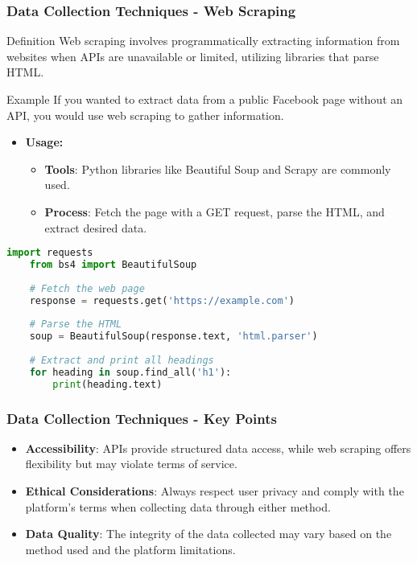 \documentclass{beamer}
\begin{document}
\begin{frame}[fragile]
    \frametitle{Data Collection Techniques - Web Scraping}
    \begin{block}{Definition}
        Web scraping involves programmatically extracting information from websites when APIs are unavailable or limited, utilizing libraries that parse HTML.
    \end{block}

    \begin{block}{Example}
        If you wanted to extract data from a public Facebook page without an API, you would use web scraping to gather information.
    \end{block}

    \begin{itemize}
        \item \textbf{Usage:}
            \begin{itemize}
                \item \textbf{Tools}: Python libraries like Beautiful Soup and Scrapy are commonly used.
                \item \textbf{Process}: Fetch the page with a GET request, parse the HTML, and extract desired data.
            \end{itemize}
    \end{itemize}

    \begin{lstlisting}[language=Python]
    import requests
    from bs4 import BeautifulSoup
    
    # Fetch the web page
    response = requests.get('https://example.com')
    
    # Parse the HTML
    soup = BeautifulSoup(response.text, 'html.parser')
    
    # Extract and print all headings
    for heading in soup.find_all('h1'):
        print(heading.text)
    \end{lstlisting}
\end{frame}

\begin{frame}
    \frametitle{Data Collection Techniques - Key Points}
    \begin{itemize}
        \item \textbf{Accessibility}: APIs provide structured data access, while web scraping offers flexibility but may violate terms of service.
        \item \textbf{Ethical Considerations}: Always respect user privacy and comply with the platform's terms when collecting data through either method.
        \item \textbf{Data Quality}: The integrity of the data collected may vary based on the method used and the platform limitations.
    \end{itemize}
\end{frame}
\end{document}

